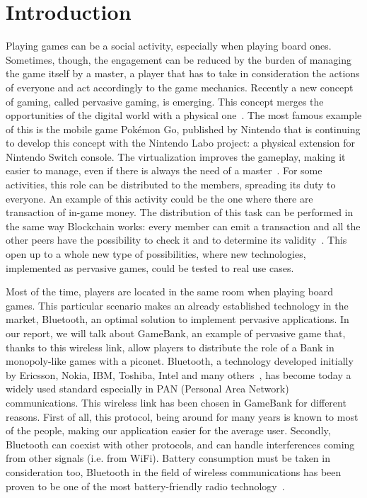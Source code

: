 \section{Introduction}
\label{introduction}

Playing games can be a social activity, especially when playing board ones. 
Sometimes, though, the engagement can be reduced by the burden of managing the 
game itself by a master, a player that has to take in consideration the actions 
of everyone and act accordingly to the game mechanics. Recently a new concept 
of gaming, called pervasive gaming, is emerging. This concept merges the 
opportunities of the digital world with a physical one~\cite{arango17}. The 
most famous example of this is the mobile game Pokémon Go, published by 
Nintendo that is continuing to develop this concept with the Nintendo Labo 
project: a physical extension for Nintendo Switch console.
The virtualization improves the gameplay, making it easier to manage, even if 
there is always the need of a master~\cite{bjork01}.
For some activities, this role can be distributed to the members, spreading its 
duty to everyone. An example of this activity could be the one where there are 
transaction of in-game money. The distribution of this task can be performed in 
the same way Blockchain works: every member can emit a transaction and all the 
other peers have the possibility to check it and to determine its 
validity~\cite{nakamoto08}. This open up to a whole new type of possibilities, 
where new technologies, implemented as pervasive games, could be tested to real 
use cases.

Most of the time, players are located in the same room when playing board 
games. This particular scenario makes an already established technology in 
the market, Bluetooth, an optimal solution to implement pervasive applications. 
In our report, we will talk about GameBank, an example of pervasive game that, 
thanks to this wireless link, allow players to distribute the role of a Bank in 
monopoly-like games with a piconet.
Bluetooth, a technology developed initially by Ericsson, Nokia, IBM, Toshiba, 
Intel and many others~\cite{haartsen00}, has become today a widely used
standard especially in PAN (Personal Area Network) communications. This
wireless link has been chosen in GameBank for different reasons. First of all,
this protocol, being around for many years is known to most of the people,
making our application easier for the average user. Secondly, Bluetooth can
coexist with other protocols, and can handle interferences coming from other
signals (i.e. from WiFi). Battery consumption must be taken in consideration 
too, Bluetooth in the field of wireless communications has been proven to be 
one of the most battery-friendly radio technology~\cite{lee07}.

